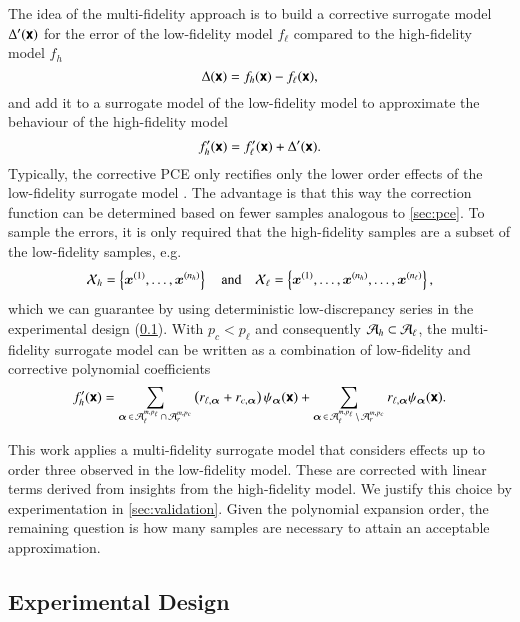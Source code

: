 
The idea of the multi-fidelity approach is to build a corrective surrogate model $\Delta'(\boldsymbol{\mathsf{x}})$ for the
error of the low-fidelity model $f_\ell$ compared to the high-fidelity model $f_h$ 
\begin{equation}
    \Delta(\boldsymbol{\mathsf{x}}) = f_h(\boldsymbol{\mathsf{x}}) - f_\ell(\boldsymbol{\mathsf{x}}),
\end{equation}
and add it to a surrogate model of the low-fidelity model to approximate the behaviour of the
high-fidelity model
\begin{equation}
    f_h'(\boldsymbol{\mathsf{x}}) = f_\ell'(\boldsymbol{\mathsf{x}}) + \Delta'(\boldsymbol{\mathsf{x}}).
\end{equation}
Typically, the corrective PCE only rectifies only the lower order effects
of the low-fidelity surrogate model \cite{palar_multi-fidelity_2016}.
The advantage is that this way the correction function can be determined
based on fewer samples analogous to \cref{sec:pce}.
To sample the errors, it is only required that the
high-fidelity samples are a subset of the low-fidelity samples, e.g.
\begin{equation}
    \mathcal{X}_h = \left\{ \bm{x}^{(1)}, \dots, \bm{x}^{(n_h)}\right\} \quad\text{and}\quad
    \mathcal{X}_\ell = \left\{ \bm{x}^{(1)}, \dots, \bm{x}^{(n_h)}, \dots, \bm{x}^{(n_\ell)}\right\},
\end{equation}
which we can guarantee by using deterministic low-discrepancy series
in the experimental design (\cref{sec:sampling}).
With $p_c < p_\ell$ and consequently $\mathcal{A}_h \subset \mathcal{A}_\ell$,
the multi-fidelity surrogate model can be written as a combination of low-fidelity
and corrective polynomial coefficients
\begin{equation}
    f_h' (\boldsymbol{\mathsf{x}}) = \sum_{{\bm{\alpha}}\,\in\,\mathcal{A}_\ell^{m,p_\ell} \,\cap\, \mathcal{A}_r^{m,p_c}}
    \left(
     r_{\ell,{\bm{\alpha}}} + r_{c,{\bm{\alpha}}}
    \right) \psi_{\bm{\alpha}}(\boldsymbol{\mathsf{x}}) + 
    \sum_{{\bm{\alpha}}\,\in\,\mathcal{A}_\ell^{m,p_\ell} \,\setminus\, \mathcal{A}_r^{m,p_c}}
    r_{\ell,{\bm{\alpha}}} \psi_{\bm{\alpha}}(\boldsymbol{\mathsf{x}}).
\end{equation}


This work applies a multi-fidelity surrogate model that considers
effects up to order three observed in the low-fidelity model. These are corrected with linear terms derived from insights from the high-fidelity model.
We justify this choice by experimentation in \cref{sec:validation}.
Given the polynomial expansion order, the remaining question is how many samples are necessary to attain an acceptable approximation.

\subsection{Experimental Design}
\label{sec:sampling}

